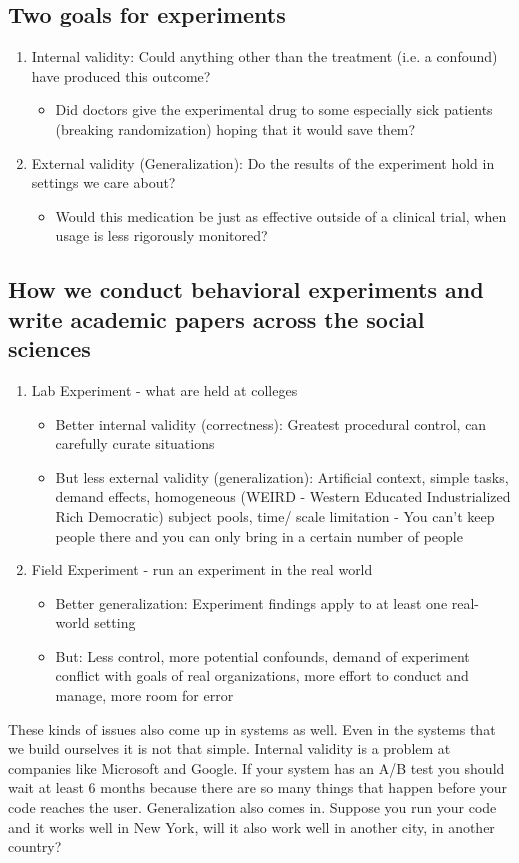 \subsection{Two goals for experiments}
\begin{enumerate}
  \item Internal validity: Could anything other than the treatment (i.e. a confound) have produced this outcome?
  	\begin{itemize}
  		\item Did doctors give the experimental drug to some especially sick patients (breaking randomization) hoping that it would save them?
	\end{itemize}
  \item External validity (Generalization): Do the results of the experiment hold in settings we care about?
  	\begin{itemize}
  		\item Would this medication be just as effective outside of a clinical trial, when usage is less rigorously monitored?
	\end{itemize}
\end{enumerate}
\subsection{How we conduct behavioral experiments and write academic papers across the social sciences
}
\begin{enumerate}
  \item Lab Experiment - what are held at colleges
  	\begin{itemize}
  		\item Better internal validity (correctness): Greatest procedural control, can carefully curate situations
        \item But less external validity (generalization): Artificial context, simple tasks, demand effects, homogeneous (WEIRD - Western Educated Industrialized Rich Democratic) subject pools, time/ scale limitation - You can’t keep people there and you can only bring in a certain number of people
	\end{itemize}
  \item Field Experiment - run an experiment in the real world
  	\begin{itemize}
  		\item Better generalization: Experiment findings apply to at least one real-world setting
        \item But: Less control, more potential confounds, demand of experiment conflict with goals of real organizations, more effort to conduct and manage, more room for error
	\end{itemize}
\end{enumerate}
These kinds of issues also come up in systems as well. Even in the systems that we build ourselves it is not that simple. Internal validity is a problem at companies like Microsoft and Google. If your system has an A/B test you should wait at least 6 months because there are so many things that happen before your code reaches the user. Generalization also comes in. Suppose you run your code and it works well in New York, will it also work well in another city, in another country?

